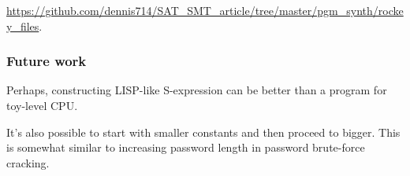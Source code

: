 \url{https://github.com/dennis714/SAT_SMT_article/tree/master/pgm_synth/rockey_files}.

\subsubsection{Future work}

Perhaps, constructing LISP-like S-expression can be better than a program for toy-level CPU.

It's also possible to start with smaller constants and then proceed to bigger.
This is somewhat similar to increasing password length in password brute-force cracking.

